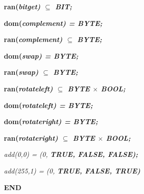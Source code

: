 \begin{sloppypar}
\hspace*{0.20in}\bf ran\rm (\it bitget\rm )  $\subseteq$  \it BIT\rm ;

\hspace*{0.20in}\bf dom\rm (\it complement\rm ) \rm = \it BYTE\rm ;

\hspace*{0.20in}\bf ran\rm (\it complement\rm )  $\subseteq$  \it BYTE\rm ;

\hspace*{0.20in}\bf dom\rm (\it swap\rm ) \rm = \it BYTE\rm ;

\hspace*{0.20in}\bf ran\rm (\it swap\rm )  $\subseteq$  \it BYTE\rm ;

\hspace*{0.20in}\bf ran\rm (\it rotateleft\rm )  $\subseteq$  \it BYTE  $\times$  \bf BOOL\rm ;

\hspace*{0.20in}\bf dom\rm (\it rotateleft\rm ) \rm = \it BYTE\rm ;

\hspace*{0.20in}\bf dom\rm (\it rotateright\rm ) \rm = \it BYTE\rm ;

\hspace*{0.20in}\bf ran\rm (\it rotateright\rm )  $\subseteq$  \it BYTE  $\times$  \bf BOOL\rm ;

\vspace*{4mm}
\hspace*{0.20in} 

\hspace*{0.20in}\it add\rm (\rm 0\rm ,\rm 0\rm ) \rm = \rm (\rm 0\rm , \bf TRUE\rm , \bf FALSE\rm , \bf FALSE\rm )\rm ;

\hspace*{0.20in}\it add\rm (\rm 2\rm 5\rm 5\rm ,\rm 1\rm ) \rm = \rm (\rm 0\rm , \bf TRUE\rm , \bf FALSE\rm , \bf TRUE\rm )

\bf END

\newpage
\end{sloppypar}
